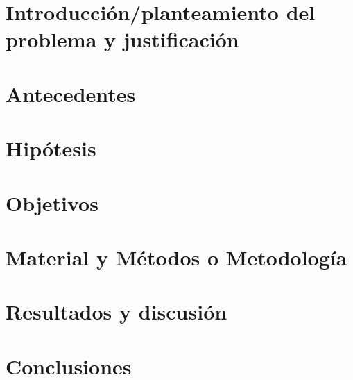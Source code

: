 \documentclass[12pt, letterpaper, spanish, twoside]{article}
\begin{document}
\section{Introducción/planteamiento del problema y justificación}


\section{Antecedentes}


\section{Hipótesis}


\section{Objetivos}


\section{Material y Métodos o Metodología}


\section{Resultados y discusión}


\section{Conclusiones}




\nocite{*} %
\renewcommand{\refname}{Referencias bibliográficas}

%

\end{document}
